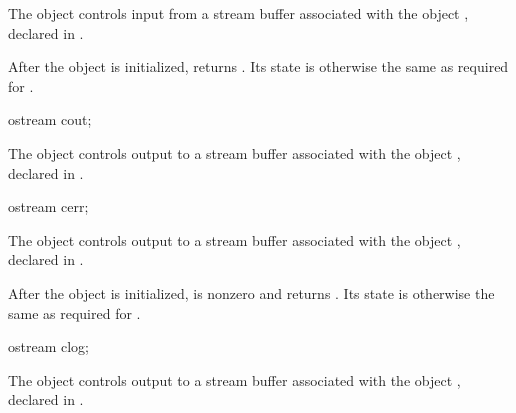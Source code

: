 \begin{itemdescr}
\pnum
The object 
controls input from a stream buffer associated with the object ,
declared in .

\pnum
After the object
is initialized,
returns
.
Its state is otherwise the same as required for
.
\end{itemdescr}

\begin{indexed}{}
\begin{itemdecl}
ostream cout;
\end{itemdecl}
\end{indexed}

\begin{itemdescr}
\pnum
The object 
controls output to a stream buffer associated with the object ,
declared in .
\end{itemdescr}

\begin{indexed}{}
\begin{itemdecl}
ostream cerr;
\end{itemdecl}
\end{indexed}

\begin{itemdescr}
\pnum
The object 
controls output to a stream buffer associated with the object ,
declared in .

\pnum
After the object
is initialized,
is nonzero and  returns .
Its state is otherwise the same as required for
.
\end{itemdescr}

\begin{indexed}{}
\begin{itemdecl}
ostream clog;
\end{itemdecl}
\end{indexed}

\begin{itemdescr}
\pnum
The object 
controls output to a stream buffer
associated with the object ,
declared in .
\end{itemdescr}

